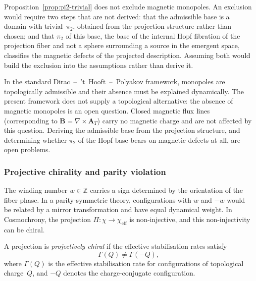     \begin{remark}
      \label{cor:no-monopoles}
      Proposition~\ref{prop:pi2-trivial} does not exclude magnetic monopoles.
      An exclusion would require two steps that are not derived: that the admissible base is a
      domain with trivial~$\pi_2$, obtained from the projection structure rather than chosen; and
      that $\pi_2$ of this base, the base of the internal Hopf fibration of the projection fiber and
      not a sphere surrounding a source in the emergent space, classifies the magnetic defects of
      the projected description.
      Assuming both would build the exclusion into the assumptions rather than derive it.
    \end{remark}

    In the standard Dirac~--~'t~Hooft~--~Polyakov framework, monopoles are
    topologically admissible and their absence must be explained dynamically.
    The present framework does not supply a topological alternative: the absence of magnetic
    monopoles is an open question.
    Closed magnetic flux lines (corresponding to $\mathbf{B} = \nabla \times \mathbf{A}_T$)
    carry no magnetic charge and are not affected by this question.
    Deriving the admissible base from the projection structure, and determining whether $\pi_2$ of
    the Hopf base bears on magnetic defects at all, are open problems.

  \subsubsection*{Projective chirality and parity violation}
    \label{sec:projective-chirality}

    The winding number $w \in \mathbb{Z}$ carries a sign determined by the
    orientation of the fiber phase.
    In a parity-symmetric theory, configurations with $w$ and $-w$ would be
    related by a mirror transformation and have equal dynamical weight.
    In Cosmochrony, the projection $\Pi : \chi \to \chi_{\mathrm{eff}}$ is
    non-injective, and this non-injectivity can be chiral.

    \begin{definition}
      \label{def:projective-chirality}
      A projection is \emph{projectively chiral} if the effective
      stabilisation rates satisfy
      \begin{equation}
        \Gamma(Q) \neq \Gamma(-Q),
      \end{equation}
      where $\Gamma(Q)$ is the effective stabilisation rate for configurations
      of topological charge~$Q$, and $-Q$ denotes the charge-conjugate
      configuration.
    \end{definition}

